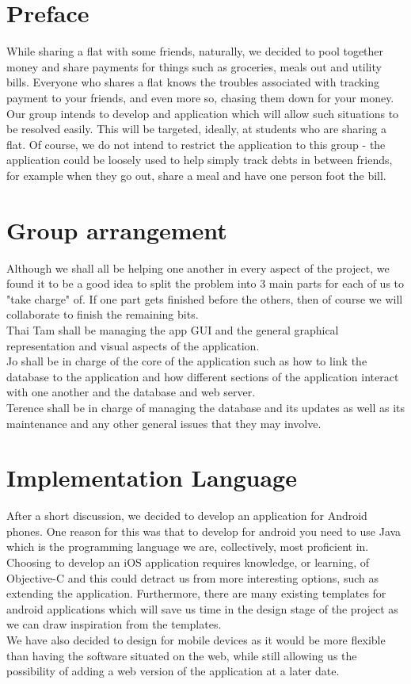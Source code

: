 \documentclass[a4paper,11pt]{article}
\begin{document}
\section*{Preface}
While sharing a flat with some friends, naturally, we decided to pool together money and share payments for things such as groceries, meals out and utility bills. Everyone who shares a flat knows the troubles associated with tracking payment to your friends, and even more so, chasing them down for your money. Our group intends to develop and application which will allow such situations to be resolved easily. This will be targeted, ideally, at students who are sharing a flat. Of course, we do not intend to restrict the application to this group - the application could be loosely used to help simply track debts in between friends, for example when they go out, share a meal and have one person foot the bill.

\section*{Group arrangement}
Although we shall all be helping one another in every aspect of the project, we found it to be a good idea to split the problem into 3 main parts for each of us to "take charge" of. If one part gets finished before the others, then of course we will collaborate to finish the remaining bits.\\ 
Thai Tam shall be managing the app GUI and the general graphical representation and visual aspects of the application.\\
Jo shall be in charge of the core of the application such as how to link the database to the application and how different sections of the application interact with one another and the database and web server.\\
Terence shall be in charge of managing the database and its updates as well as its maintenance and any other general issues that they may involve.

\section*{Implementation Language}

After a short discussion, we decided to develop an application for Android phones. One reason for this was that to develop for android you need to use Java which is the programming language we are, collectively, most proficient in. Choosing to develop an iOS application requires knowledge, or learning, of Objective-C and this could detract us from more interesting options, such as extending the application. Furthermore, there are many existing templates for android applications which will save us time in the design stage of the project as we can draw inspiration from the templates. \\
We have also decided to design for mobile devices as it would be more flexible than having the software situated on the web, while still allowing us the possibility of adding a web version of the application at a later date.
\end{document}
